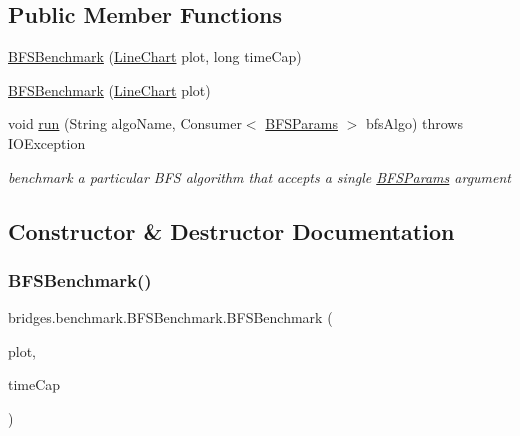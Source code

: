 \subsection*{Public Member Functions}
\begin{DoxyCompactItemize}
\item 
\hyperlink{classbridges_1_1benchmark_1_1_b_f_s_benchmark_a47647a605d5cd6523e1472191e12ab94}{B\+F\+S\+Benchmark} (\hyperlink{classbridges_1_1base_1_1_line_chart}{Line\+Chart} plot, long time\+Cap)
\item 
\hyperlink{classbridges_1_1benchmark_1_1_b_f_s_benchmark_afe4a4dd46295e41c1cb7ee25c616a2c9}{B\+F\+S\+Benchmark} (\hyperlink{classbridges_1_1base_1_1_line_chart}{Line\+Chart} plot)
\item 
void \hyperlink{classbridges_1_1benchmark_1_1_b_f_s_benchmark_a0f530ad46a8a379b86285e0efcf8d51c}{run} (String algo\+Name, Consumer$<$ \hyperlink{classbridges_1_1benchmark_1_1_b_f_s_params}{B\+F\+S\+Params} $>$ bfs\+Algo)  throws I\+O\+Exception 
\begin{DoxyCompactList}\small\item\em benchmark a particular B\+FS algorithm that accepts a single \hyperlink{classbridges_1_1benchmark_1_1_b_f_s_params}{B\+F\+S\+Params} argument \end{DoxyCompactList}\end{DoxyCompactItemize}


\subsection{Constructor \& Destructor Documentation}
\mbox{\label{classbridges_1_1benchmark_1_1_b_f_s_benchmark_a47647a605d5cd6523e1472191e12ab94}} 
\subsubsection{\texorpdfstring{B\+F\+S\+Benchmark()}{BFSBenchmark()}\hspace{0.1cm}{\footnotesize\ttfamily [1/2]}}
{\footnotesize\ttfamily bridges.\+benchmark.\+B\+F\+S\+Benchmark.\+B\+F\+S\+Benchmark (\begin{DoxyParamCaption}\item[{\hyperlink{classbridges_1_1base_1_1_line_chart}{Line\+Chart}}]{plot,  }\item[{long}]{time\+Cap }\end{DoxyParamCaption})}

